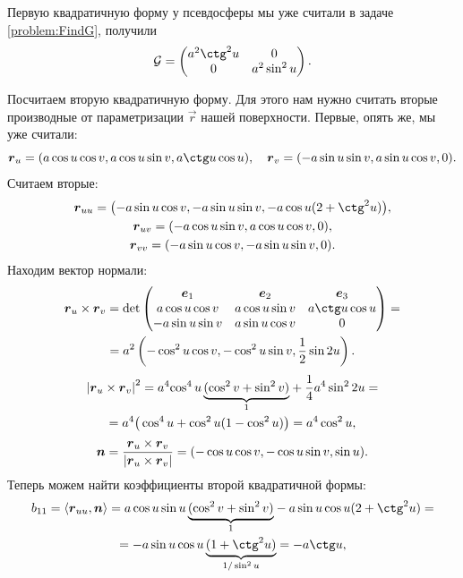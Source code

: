 \begin{solution}
	Первую квадратичную форму у псевдосферы мы уже считали в задаче \ref{problem:FindG}, получили
	\[
		\G =
		\begin{pmatrix}
			a^2\ctg^2u & 0\\
			0 & a^2\sin^2u
		\end{pmatrix}.
	\]

	Посчитаем вторую квадратичную форму. Для этого нам нужно считать вторые производные от параметризации $\vec{r}$ нашей поверхности. Первые, опять же, мы уже считали:
	\[
		\vec{r}_u = (a\cos u\cos v, a\cos u\sin v, a\ctg u\cos u),\quad\vec{r}_v = (-a\sin u\sin v, a\sin u\cos v, 0).
	\]
	Считаем вторые:
	\begin{gather*}
		\vec{r}_{uu} = \big({-a\sin u\cos v}, -a\sin u\sin v, -a\cos u(2 + \ctg^2u)\big),\\
		\vec{r}_{uv} = (-a\cos u\sin v, a\cos u\cos v, 0),\\
		\vec{r}_{vv} = (-a\sin u\cos v, -a\sin u\sin v, 0).
	\end{gather*}
	Находим вектор нормали:
	\begin{multline*}
		\vec{r}_u \times \vec{r}_v = \det
		\begin{pmatrix}
			\vec{e}_1 & \vec{e}_2 & \vec{e}_3\\
			a\cos u\cos v & a\cos u\sin v & a\ctg u\cos u\\
			-a\sin u\sin v & a\sin u\cos v & 0
		\end{pmatrix} =\\ = a^2 \br{{-\cos^2u\cos v}, -\cos^2u\sin v, \frac{1}{2}\sin 2u}.
	\end{multline*}
	\begin{multline*}
		\left\lvert\boldsymbol{r}_u \times \boldsymbol{r}_v\right\rvert^2 = a^4{\cos^4u\underbrace{(\cos^2v + \sin^2v)}_{1}} + \frac{1}{4}a^4\sin^22u =\\ = a^4\big(\cos^4u + \cos^2u(1 - \cos^2u)\big) = a^4\cos^2u,
	\end{multline*}
	\begin{gather*}
		\boldsymbol{n} = \frac{\boldsymbol{r}_u \times \boldsymbol{r}_v}{\left\lvert\boldsymbol{r}_u \times \boldsymbol{r}_v\right\rvert} = (-\cos u\cos v, -\cos u\sin v, \sin u).
	\end{gather*}
	Теперь можем найти коэффициенты второй квадратичной формы:
	\begin{multline*}
		b_{11} = \langle\vec{r}_{uu}, \vec{n}\rangle = {a\cos u\sin u\underbrace{(\cos^2 v + \sin ^2 v)}_{1}} - a\sin u\cos u(2 + \ctg^2u) =\\ = {-a\sin u\cos u\underbrace{(1 + \ctg^2 u)}_{1 / \sin^2u}} = -a\ctg u,

\end{multline*}
\end{solution}
